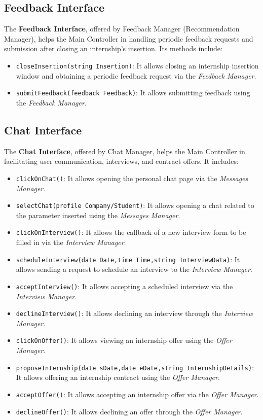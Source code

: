 \subsection{Feedback Interface}
The \textbf{Feedback Interface}, offered by Feedback Manager (Recommendation Manager), helps the Main Controller in handling periodic feedback requests and submission after closing an internship's insertion. Its methods include:
\begin{itemize}
    \item \texttt{closeInsertion(string Insertion)}: It allows closing an internship insertion window and obtaining a periodic feedback request via the \textit{Feedback Manager}.
    \item \texttt{submitFeedback(feedback Feedback)}: It allows submitting feedback using the \textit{Feedback Manager}.
\end{itemize}

\subsection{Chat Interface}
The \textbf{Chat Interface}, offered by Chat Manager, helps the Main Controller in  facilitating user communication, interviews, and contract offers. It includes:
\begin{itemize}
    \item \texttt{clickOnChat()}: It allows opening the personal chat page via the \textit{Messages Manager}.
    \item \texttt{selectChat(profile Company/Student)}: It allows opening a chat related to the parameter inserted using the \textit{Messages Manager}.
    \item \texttt{clickOnInterview()}: It allows the callback of a new interview form to be filled in via the \textit{Interview Manager}.
    \item \texttt{scheduleInterview(date Date,time Time,string InterviewData)}: It allows sending a request to schedule an interview to the \textit{Interview Manager}.
    \item \texttt{acceptInterview()}: It allows accepting a scheduled interview via the \textit{Interview Manager}.
    \item \texttt{declineInterview()}: It allows declining an interview through the \textit{Interview Manager}.
    \item \texttt{clickOnOffer()}: It allows viewing an internship offer using the \textit{Offer Manager}.
    \item \texttt{proposeInternship(date sDate,date eDate,string InternshipDetails)}: It allows offering an internship contract using the \textit{Offer Manager}.
    \item \texttt{acceptOffer()}: It allows accepting an internship offer via the \textit{Offer Manager}.
    \item \texttt{declineOffer()}: It allows declining an offer through the \textit{Offer Manager}.
\end{itemize}

